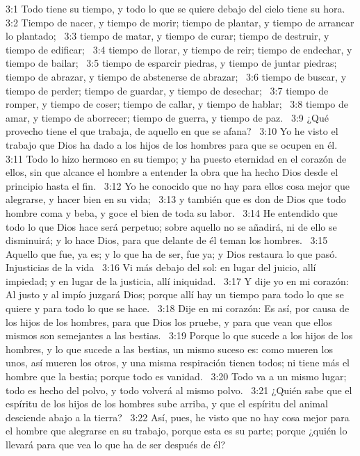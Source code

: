 3:1 Todo tiene su tiempo, y todo lo que se quiere debajo del cielo tiene su hora.  
3:2 Tiempo de nacer, y tiempo de morir; tiempo de plantar, y tiempo de arrancar lo plantado;  
3:3 tiempo de matar, y tiempo de curar; tiempo de destruir, y tiempo de edificar;  
3:4 tiempo de llorar, y tiempo de reir; tiempo de endechar, y tiempo de bailar;  
3:5 tiempo de esparcir piedras, y tiempo de juntar piedras; tiempo de abrazar, y tiempo de abstenerse de abrazar;  
3:6 tiempo de buscar, y tiempo de perder; tiempo de guardar, y tiempo de desechar;  
3:7 tiempo de romper, y tiempo de coser; tiempo de callar, y tiempo de hablar;  
3:8 tiempo de amar, y tiempo de aborrecer; tiempo de guerra, y tiempo de paz.  
3:9 ¿Qué provecho tiene el que trabaja, de aquello en que se afana?  
3:10 Yo he visto el trabajo que Dios ha dado a los hijos de los hombres para que se ocupen en él.  
3:11 Todo lo hizo hermoso en su tiempo; y ha puesto eternidad en el corazón de ellos, sin que alcance el hombre a entender la obra que ha hecho Dios desde el principio hasta el fin.  
3:12 Yo he conocido que no hay para ellos cosa mejor que alegrarse, y hacer bien en su vida;  
3:13 y también que es don de Dios que todo hombre coma y beba, y goce el bien de toda su labor.  
3:14 He entendido que todo lo que Dios hace será perpetuo; sobre aquello no se añadirá, ni de ello se disminuirá; y lo hace Dios, para que delante de él teman los hombres.  
3:15 Aquello que fue, ya es; y lo que ha de ser, fue ya; y Dios restaura lo que pasó.  
Injusticias de la vida  
3:16 Vi más debajo del sol: en lugar del juicio, allí impiedad; y en lugar de la justicia, allí iniquidad.  
3:17 Y dije yo en mi corazón: Al justo y al impío juzgará Dios; porque allí hay un tiempo para todo lo que se quiere y para todo lo que se hace.  
3:18 Dije en mi corazón: Es así, por causa de los hijos de los hombres, para que Dios los pruebe, y para que vean que ellos mismos son semejantes a las bestias.  
3:19 Porque lo que sucede a los hijos de los hombres, y lo que sucede a las bestias, un mismo suceso es: como mueren los unos, así mueren los otros, y una misma respiración tienen todos; ni tiene más el hombre que la bestia; porque todo es vanidad.  
3:20 Todo va a un mismo lugar; todo es hecho del polvo, y todo volverá al mismo polvo.  
3:21 ¿Quién sabe que el espíritu de los hijos de los hombres sube arriba, y que el espíritu del animal desciende abajo a la tierra?  
3:22 Así, pues, he visto que no hay cosa mejor para el hombre que alegrarse en su trabajo, porque esta es su parte; porque ¿quién lo llevará para que vea lo que ha de ser después de él?  
